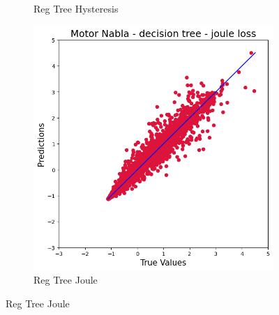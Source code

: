 \documentclass{article}
\begin{document}
\begin{figure}[!htbp]
\begin{subfigure}[b]{0.23\textwidth}
        \caption{Reg Tree Hysteresis}
    \end{subfigure}
    \hfill
    \begin{subfigure}[b]{0.23\textwidth}
        \centering
        \includegraphics[width=\textwidth]{images/Nabla/reg_tree_joule.png}
        \caption{Reg Tree Joule}
    \end{subfigure}
    
    \vspace{0.3cm}
    

\end{figure}
\end{document}
